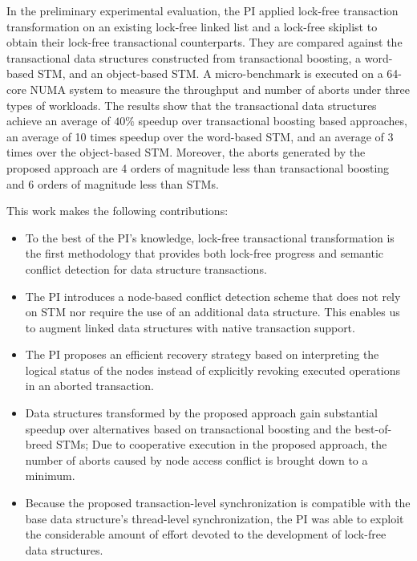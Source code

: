 In the preliminary experimental evaluation, the PI applied lock-free transaction transformation on an existing lock-free linked list and a lock-free skiplist to obtain their lock-free transactional counterparts.
They are compared against the transactional data structures constructed from transactional boosting, a word-based STM, and an object-based STM.
A micro-benchmark is executed on a 64-core NUMA system to measure the throughput and number of aborts under three types of workloads.
The results show that the transactional data structures achieve an average of $40\%$ speedup over transactional boosting based approaches, an average of 10 times speedup over the word-based STM, and an average of 3 times over the object-based STM.
Moreover, the aborts generated by the proposed approach are 4 orders of magnitude less than transactional boosting and 6 orders of magnitude less than STMs.

This work makes the following contributions:
\begin{itemize}
    \item To the best of the PI's knowledge, lock-free transactional transformation is the first methodology that provides both lock-free progress and semantic conflict detection for data structure transactions. 
    \item The PI introduces a node-based conflict detection scheme that does not rely on STM nor require the use of an additional data structure. This enables us to augment linked data structures with native transaction support.
    \item The PI proposes an efficient recovery strategy based on interpreting the logical status of the nodes instead of explicitly revoking executed operations in an aborted transaction.
    \item Data structures transformed by the proposed approach gain substantial speedup over alternatives based on transactional boosting and the best-of-breed STMs; Due to cooperative execution in the proposed approach, the number of aborts caused by node access conflict is brought down to a minimum.
    \item Because the proposed transaction-level synchronization is compatible with the base data structure's thread-level synchronization, the PI was able to exploit the considerable amount of effort devoted to the development of lock-free data structures.
\end{itemize}
